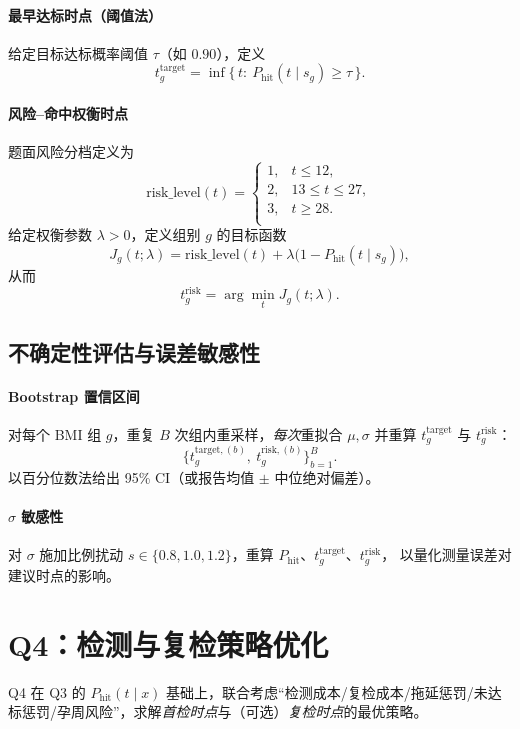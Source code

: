 \documentclass[11pt,a4paper]{article}
\begin{document}
\paragraph{最早达标时点（阈值法）}
给定目标达标概率阈值 $\tau$（如 $0.90$），定义
\[
  t^{\text{target}}_g=\inf\bigl\{\,t:\ P_{\text{hit}}(t\mid s_g)\ge \tau\,\bigr\}.
\]

\paragraph{风险--命中权衡时点}
题面风险分档定义为
\[
\text{risk\_level}(t)=
\begin{cases}
1, & t\le 12,\\
2, & 13\le t \le 27,\\
3, & t\ge 28.\\
\end{cases}
\]
给定权衡参数 $\lambda>0$，定义组别 $g$ 的目标函数
\[
  J_g(t;\lambda)=\text{risk\_level}(t)+\lambda\bigl(1-P_{\text{hit}}(t\mid s_g)\bigr),
\]
从而
\[
  t^{\text{risk}}_g=\arg\min_t J_g(t;\lambda).
\]

\subsection{不确定性评估与误差敏感性}
\paragraph{Bootstrap 置信区间}
对每个 BMI 组 $g$，重复 $B$ 次组内重采样，\emph{每次}重拟合 $\mu,\sigma$ 并重算 $t^{\text{target}}_g$ 与 $t^{\text{risk}}_g$：
\[
  \bigl\{t^{\text{target},(b)}_g,\ t^{\text{risk},(b)}_g\bigr\}_{b=1}^B.
\]
以百分位数法给出 95\% CI（或报告均值 $\pm$ 中位绝对偏差）。

\paragraph{$\sigma$ 敏感性}
对 $\sigma$ 施加比例扰动 $s\in\{0.8,1.0,1.2\}$，重算
\(P_{\text{hit}}\)、$t^{\text{target}}_g$、$t^{\text{risk}}_g$，
以量化测量误差对建议时点的影响。

\section{Q4：检测与复检策略优化}
Q4 在 Q3 的 $P_{\text{hit}}(t\mid x)$ 基础上，联合考虑“检测成本/复检成本/拖延惩罚/未达标惩罚/孕周风险”，求解\emph{首检时点}与（可选）\emph{复检时点}的最优策略。
\end{document}
